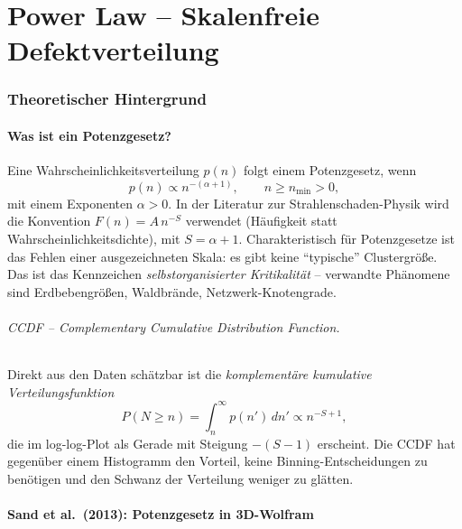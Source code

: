 \documentclass[11pt,a4paper]{article}
\begin{document}
\newpage
\FloatBarrier
\part{Power Law -- Skalenfreie Defektverteilung}
\label{part:powerlaw}

\FloatBarrier
\section{Theoretischer Hintergrund}
\label{sec:powerlaw-theory}

\subsection{Was ist ein Potenzgesetz?}

Eine Wahrscheinlichkeitsverteilung $p(n)$ folgt einem Potenzgesetz, wenn
\begin{equation}
p(n) \propto n^{-(\alpha + 1)}, \qquad n \geq n_\text{min} > 0,
\label{eq:powerlaw}
\end{equation}
mit einem Exponenten $\alpha > 0$. In der Literatur zur Strahlenschaden-Physik
wird die Konvention $F(n) = A\,n^{-S}$ verwendet (Häufigkeit statt
Wahrscheinlichkeitsdichte), mit $S = \alpha + 1$. Charakteristisch für
Potenzgesetze ist das Fehlen einer ausgezeichneten Skala: es gibt keine
``typische'' Clustergröße. Das ist das Kennzeichen \emph{selbstorganisierter
Kritikalität} -- verwandte Phänomene sind Erdbebengrößen, Waldbrände,
Netzwerk-Knotengrade.

\paragraph{CCDF -- Complementary Cumulative Distribution Function.}
Direkt aus den Daten schätzbar ist die \emph{komplementäre kumulative
Verteilungsfunktion}
\begin{equation}
P(N \geq n) = \int_n^\infty p(n')\,dn' \propto n^{-S+1},
\label{eq:ccdf}
\end{equation}
die im log-log-Plot als Gerade mit Steigung $-(S-1)$ erscheint.
Die CCDF hat gegenüber einem Histogramm den Vorteil, keine Binning-Entscheidungen
zu benötigen und den Schwanz der Verteilung weniger zu glätten.

\subsection{Sand et al.\ (2013): Potenzgesetz in 3D-Wolfram}
\label{sec:sand}
\end{document}
